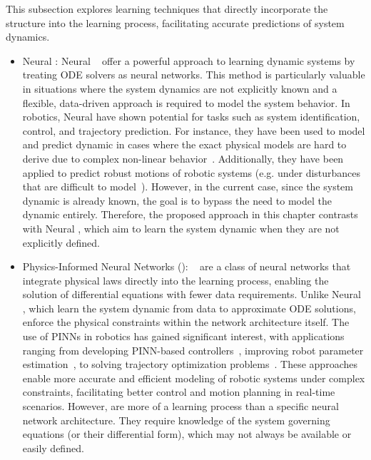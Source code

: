 This subsection explores learning techniques that directly incorporate the  structure into the learning process, facilitating accurate predictions of system dynamics.

\begin{itemize}
    \item Neural : Neural ~\cite{cNeuralodes} offer a powerful approach to learning dynamic systems by treating ODE solvers as neural networks. 
    This method is particularly valuable in situations where the system dynamics are not explicitly known and a flexible, data-driven approach is required to model the system behavior.
    In robotics, Neural  have shown potential for tasks such as system identification, control, and trajectory prediction. 
    For instance, they have been used to model and predict dynamic in cases where the exact physical models are hard to derive due to complex non-linear behavior~\cite{cNeuralodes}. 
    Additionally, they have been applied to predict robust motions of robotic systems (e.g. under disturbances that are difficult to model~\cite{cNODEmotion}).
    However, in the current case, since the system dynamic is already known, the goal is to bypass the need to model the dynamic entirely. 
    Therefore, the proposed approach in this chapter contrasts with Neural , which aim to learn the system dynamic when they are not explicitly defined.
    \item Physics-Informed Neural Networks (): ~\cite{cPinns} are a class of neural networks that integrate physical laws directly into the learning process, enabling the solution of differential equations with fewer data requirements. 
    Unlike Neural , which learn the system dynamic from data to approximate ODE solutions,  enforce the physical constraints within the network architecture itself. 
    The use of PINNs in robotics has gained significant interest, with applications ranging from developing PINN-based controllers~\cite{cPinnControl1, cPinnControl2}, improving robot parameter estimation~\cite{cPinnDyna}, to solving trajectory optimization problems~\cite{cPinnMotion}.
    These approaches enable more accurate and efficient modeling of robotic systems under complex constraints, facilitating better control and motion planning in real-time scenarios.
    However,  are more of a learning process than a specific neural network architecture.
    They require knowledge of the system governing equations (or their differential form), which may not always be available or easily defined.

\end{itemize}
